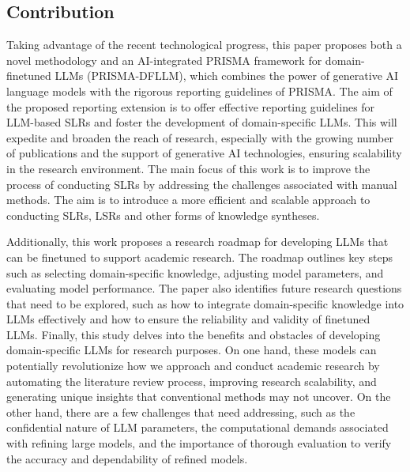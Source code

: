 \documentclass{article}
\begin{document}
\subsection{Contribution}

Taking advantage of the recent technological progress, this paper proposes both a novel methodology and an AI-integrated PRISMA framework for domain-finetuned LLMs (PRISMA-DFLLM), which combines the power of generative AI language models with the rigorous reporting guidelines of PRISMA. The aim of the proposed reporting extension is to offer effective reporting guidelines for LLM-based SLRs and foster the development of domain-specific LLMs. This will expedite and broaden the reach of research, especially with the growing number of publications and the support of generative AI technologies, ensuring scalability in the research environment.
The main focus of this work is to improve the process of conducting SLRs by addressing the challenges associated with manual methods. The aim is to introduce a more efficient and scalable approach to conducting SLRs, LSRs and other forms of knowledge syntheses.

Additionally, this work proposes a research roadmap for developing LLMs that can be finetuned to support academic research. The roadmap outlines key steps such as selecting domain-specific knowledge, adjusting model parameters, and evaluating model performance. The paper also identifies future research questions that need to be explored, such as how to integrate domain-specific knowledge into LLMs effectively and how to ensure the reliability and validity of finetuned LLMs. 
Finally, this study delves into the benefits and obstacles of developing domain-specific LLMs for research purposes. On one hand, these models can potentially revolutionize how we approach and conduct academic research by automating the literature review process, improving research scalability, and generating unique insights that conventional methods may not uncover. On the other hand, there are a few challenges that need addressing, such as the confidential nature of LLM parameters, the computational demands associated with refining large models, and the importance of thorough evaluation to verify the accuracy and dependability of refined models.



\end{document}
